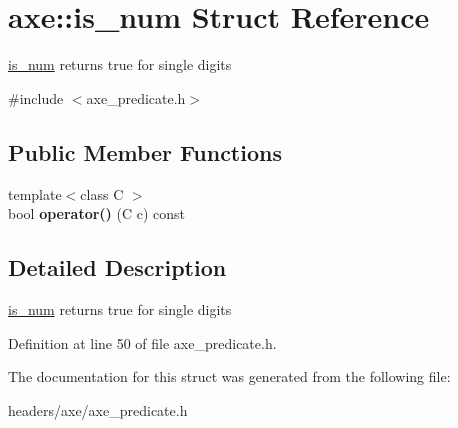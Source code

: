 \hypertarget{structaxe_1_1is__num}{\section{axe\+:\+:is\+\_\+num Struct Reference}
\label{structaxe_1_1is__num}
}


\hyperlink{structaxe_1_1is__num}{is\+\_\+num} returns true for single digits  




{\ttfamily \#include $<$axe\+\_\+predicate.\+h$>$}

\subsection*{Public Member Functions}
\begin{DoxyCompactItemize}
\item 
\hypertarget{structaxe_1_1is__num_a947c0acd5d01b43f680bb9c9cb2e3256}{{\footnotesize template$<$class C $>$ }\\bool {\bfseries operator()} (C c) const }\label{structaxe_1_1is__num_a947c0acd5d01b43f680bb9c9cb2e3256}

\end{DoxyCompactItemize}


\subsection{Detailed Description}
\hyperlink{structaxe_1_1is__num}{is\+\_\+num} returns true for single digits 

Definition at line 50 of file axe\+\_\+predicate.\+h.



The documentation for this struct was generated from the following file\+:\begin{DoxyCompactItemize}
\item 
headers/axe/axe\+\_\+predicate.\+h\end{DoxyCompactItemize}
